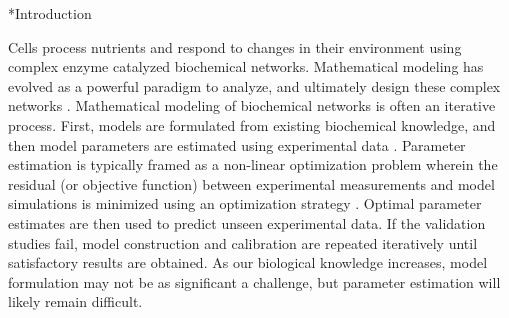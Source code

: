 \documentclass[12pt]{article}
\makeatletter
\renewcommand\section{\@startsection
	{subsection}{2}{0mm}
	{-0.2in}
	{0.05\baselineskip}
	{\normalfont\large\bfseries}}
\makeatother
\begin{document}

\pagebreak

\setcounter{page}{1}

\linenumbers


\section*{Introduction}

Cells process nutrients and respond to changes in their environment using complex enzyme catalyzed biochemical networks.
Mathematical modeling has evolved as a powerful paradigm to analyze, and ultimately design these complex networks \cite{assmus2006dynamics, Riel:2006aa,Jaqaman:2006aa,kitano2002systems,hood2004systems}. Mathematical modeling of biochemical networks is often an iterative process.
First, models are formulated from existing biochemical knowledge, and then model parameters are estimated using experimental data \cite{Aldridge:2006aa,banga2008optimization,ashyraliyev2009systems}.
Parameter estimation is typically framed as a non-linear optimization problem wherein the residual (or objective function) between experimental measurements and model simulations is minimized using an optimization strategy \cite{moles2003parameter}.
Optimal parameter estimates are then used to predict unseen experimental data.
If the validation studies fail, model construction and calibration are repeated iteratively until satisfactory results are obtained.
As our biological knowledge increases, model formulation may not be as significant a challenge, but parameter estimation will likely remain difficult.
\end{document}
